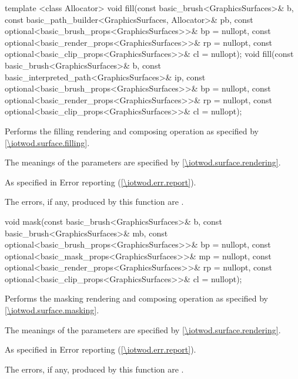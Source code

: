 %
\begin{itemdecl}
template <class Allocator>
void fill(const basic_brush<GraphicsSurfaces>& b,
  const basic_path_builder<GraphicsSurfaces, Allocator>& pb,
  const optional<basic_brush_props<GraphicsSurfaces>>& bp = nullopt,
  const optional<basic_render_props<GraphicsSurfaces>>& rp = nullopt,
  const optional<basic_clip_props<GraphicsSurfaces>>& cl = nullopt);
void fill(const basic_brush<GraphicsSurfaces>& b,
  const basic_interpreted_path<GraphicsSurfaces>& ip,
  const optional<basic_brush_props<GraphicsSurfaces>>& bp = nullopt,
  const optional<basic_render_props<GraphicsSurfaces>>& rp = nullopt,
  const optional<basic_clip_props<GraphicsSurfaces>>& cl = nullopt);
\end{itemdecl}
\begin{itemdescr}
\pnum
\effects
Performs the filling rendering and composing operation as specified by \ref{\iotwod.surface.filling}.

\pnum
The meanings of the parameters are specified by \ref{\iotwod.surface.rendering}.

\pnum
\throws
As specified in Error reporting (\ref{\iotwod.err.report}).

\pnum
\errors
The errors, if any, produced by this function are .
\end{itemdescr}

%
\begin{itemdecl}
void mask(const basic_brush<GraphicsSurfaces>& b,
  const basic_brush<GraphicsSurfaces>& mb,
  const optional<basic_brush_props<GraphicsSurfaces>>& bp = nullopt,
  const optional<basic_mask_props<GraphicsSurfaces>>& mp = nullopt,
  const optional<basic_render_props<GraphicsSurfaces>>& rp = nullopt,
  const optional<basic_clip_props<GraphicsSurfaces>>& cl = nullopt);
\end{itemdecl}
\begin{itemdescr}
\pnum
\effects
Performs the masking rendering and composing operation as specified by \ref{\iotwod.surface.masking}.

\pnum
The meanings of the parameters are specified by \ref{\iotwod.surface.rendering}.

\pnum
\throws
As specified in Error reporting (\ref{\iotwod.err.report}).

\pnum
\errors

The errors, if any, produced by this function are .
\end{itemdescr}
